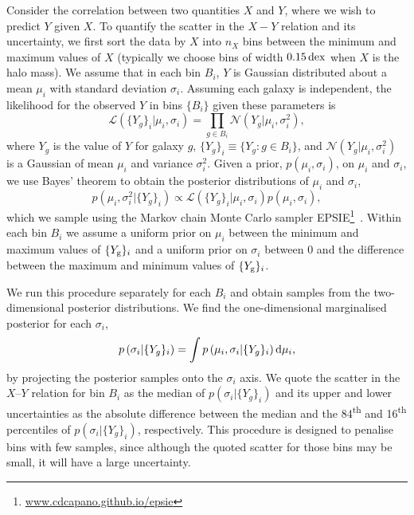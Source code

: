 \documentclass[usenatbib,useAMS]{mnras}
\begin{document}
Consider the correlation between two quantities $X$ and $Y$, where we wish to predict $Y$ given $X$. To quantify the scatter in the $X-Y$ relation and its uncertainty, we first sort the data by $X$ into $n_X$ bins between the minimum and maximum values of $X$ (typically we choose bins of width $0.15{\, \rm dex}$ when $X$ is the halo mass). We assume that in each bin $B_i$, $Y$ is Gaussian distributed about a mean $\mu_i$ with standard deviation $\sigma_i$. Assuming each galaxy is independent, the likelihood for the observed $Y$ in bins $\{B_i\}$ given these parameters is
\begin{equation}
	 \mathcal{L} \left( \{ Y_g \}_i | \mu_i, \sigma_i \right)
	 = \prod_{g \in B_i} \mathcal{N}\left(Y_g | \mu_i, \sigma^2_i\right),
\end{equation}
where $Y_g$ is the value of $Y$ for galaxy $g$, $\{ Y_g \}_i \equiv \{ Y_g : g \in B_i \}$, and $\mathcal{N}( Y_g | \mu_i, \sigma^2_i )$ is a Gaussian of mean $\mu_{i}$ and variance $\sigma_i^2$. Given a prior, $p \left( \mu_i, \sigma_i \right)$, on $\mu_i$ and $\sigma_i$, we use Bayes' theorem to obtain the posterior distributions of $\mu_i$ and $\sigma_i$,
\begin{equation}
	p \left(\mu_i, \sigma_i^2| \{ Y_g \}_i \right) 
    \propto \mathcal{L} \left(\{ Y_g \}_i|\mu_i, \sigma_i \right) p \left( \mu_i, \sigma_i \right) ,
\end{equation}	
which we sample using the Markov chain Monte Carlo sampler \textsc{EPSIE}\footnote{\href{https://cdcapano.github.io/epsie/latest/index.html}{www.cdcapano.github.io/epsie}}~\citep{epsie}. Within each bin $B_i$ we assume a uniform prior on $\mu_i$ between the minimum and maximum values of  $\{Y_{\rm g}\}_i$ and a uniform prior on $\sigma_i$ between $0$ and the difference between the maximum and minimum values of $\{Y_{\rm g}\}_i$.

We run this procedure separately for each $B_i$ and obtain samples from the two-dimensional posterior distributions. We find the one-dimensional marginalised posterior for each $\sigma_i$,
\begin{equation}
    p \left(\sigma_i| \{ Y_g \}_i \right) = \int p \left(\mu_i, \sigma_i| \{ Y_g \}_i \right) {\rm d}\mu_i,
\end{equation}
by projecting the posterior samples onto the $\sigma_i$ axis. We quote the scatter in the $X$--$Y$ relation for bin $B_i$ as the median of $p \left(\sigma_i| \{ Y_g \}_i \right)$ and its upper and lower uncertainties as the absolute difference between the median and the 84\textsuperscript{th} and 16\textsuperscript{th} percentiles of $p \left(\sigma_i| \{ Y_g \}_i \right)$, respectively. This procedure is designed to penalise bins with few samples, since although the quoted scatter for those bins may be small, it will have a large uncertainty.
\end{document}
